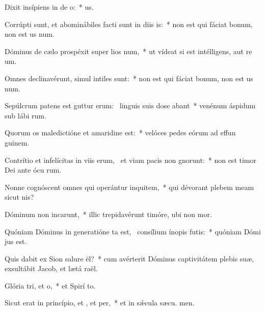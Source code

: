 \item Dixit insípiens in de o:~*   us.
\item Corrúpti sunt, et abominábiles facti sunt in diis is:~* non est qui fáciat bonum, non est us  num.
\item Dóminus de cælo prospéxit super lios num,~* ut vídeat si est intélligens, aut re um.
\item Omnes declinavérunt, simul intiles  sunt:~* non est qui fáciat bonum, non est us  num.
\item Sepúlcrum patens est guttur erum:~\pscross{} linguis suis dose abant~* venénum áspidum sub lábi rum.
\item Quorum os maledictióne et amaridine  est:~* velóces pedes eórum ad effun guinem.
\item Contrítio et infelícitas in viis erum,~\pscross{} et viam pacis non gnorunt:~* non est timor Dei ante ócu rum.
\item Nonne cognóscent omnes qui operántur inquitem,~* qui dévorant plebem meam sicut  nis?
\item Dóminum non incarunt,~* illic trepidavérunt timóre, ubi non  mor.
\item Quóniam Dóminus in generatióne ta est,~\pscross{} consílium ínopis futis:~* quóniam Dómi  jus est.
\item Quis dabit ex Sion salure ël?~* cum avérterit Dóminus captivitátem plebis suæ, exsultábit Jacob, et lætá raël.
\item Glória tri, et o,~* et Spirí to.
\item Sicut erat in princípio, et , et per,~* et in sǽcula sæcu. men.
